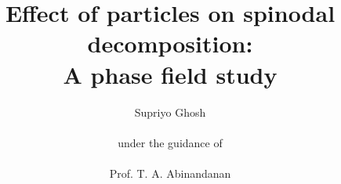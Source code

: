 \documentclass[12pt]{iiscthes}
\theoremstyle{definition}
\theoremstyle{definition}
\theoremstyle{remark}
\begin{document}
\begin{frontmatter}
%
%

\title{Effect of particles on spinodal decomposition: \\
A phase field study
}

\author{Supriyo Ghosh\\
\textbf{}\\
\textnormal{under the guidance of}\\
\textbf{}\\
\large{Prof. T. A. Abinandanan}
}

\me
\iisclogotrue %
\maketitle
% 
% 
% 


\end{frontmatter}
\end{document}
